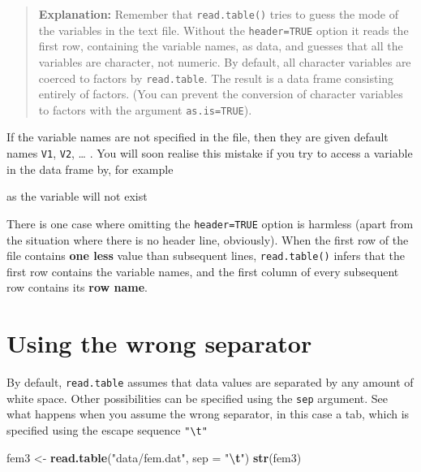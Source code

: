 \documentclass[
]{book}
\newenvironment{Shaded}{\begin{snugshade}}{\end{snugshade}}
\newcommand{\AttributeTok}[1]{\textcolor[rgb]{0.13,0.29,0.53}{#1}}
\newcommand{\FunctionTok}[1]{\textcolor[rgb]{0.13,0.29,0.53}{\textbf{#1}}}
\newcommand{\NormalTok}[1]{#1}
\newcommand{\OtherTok}[1]{\textcolor[rgb]{0.56,0.35,0.01}{#1}}
\newcommand{\SpecialCharTok}[1]{\textcolor[rgb]{0.81,0.36,0.00}{\textbf{#1}}}
\newcommand{\StringTok}[1]{\textcolor[rgb]{0.31,0.60,0.02}{#1}}
\begin{document}
\begin{quote}
\textbf{Explanation:} Remember that \texttt{read.table()} tries to guess
the mode of the variables in the text file. Without the
\texttt{header=TRUE} option it reads the first row, containing the
variable names, as data, and guesses that all the variables are
character, not numeric. By default, all character variables are
coerced to factors by \texttt{read.table}. The result is a data frame
consisting entirely of factors. (You can prevent the conversion of
character variables to factors with the argument \texttt{as.is=TRUE}).
\end{quote}

If the variable names are not specified in the file, then they are
given default names \texttt{V1}, \texttt{V2}, \ldots{} . You will soon realise this
mistake if you try to access a variable in the data frame by, for
example

\begin{Shaded}
\end{Shaded}

as the variable will not exist

There is one case where omitting the \texttt{header=TRUE} option is
harmless (apart from the situation where there is no header line,
obviously). When the first row of the file contains \textbf{one less}
value than subsequent lines, \texttt{read.table()} infers that the first
row contains the variable names, and the first column of every
subsequent row contains its \textbf{row name}.

\section{Using the wrong separator}\label{using-the-wrong-separator}

By default, \texttt{read.table} assumes that data values are separated
by any amount of white space. Other possibilities can be specified
using the \texttt{sep} argument. See what happens when you assume the
wrong separator, in this case a tab, which is specified using the
escape sequence \texttt{"\textbackslash{}t"}

\begin{Shaded}
\begin{Highlighting}[]
\NormalTok{fem3 }\OtherTok{\textless{}{-}} \FunctionTok{read.table}\NormalTok{(}\StringTok{"data/fem.dat"}\NormalTok{, }\AttributeTok{sep =} \StringTok{"}\SpecialCharTok{\textbackslash{}t}\StringTok{"}\NormalTok{)}
\FunctionTok{str}\NormalTok{(fem3)}
\end{Highlighting}
\end{Shaded}
\end{document}
